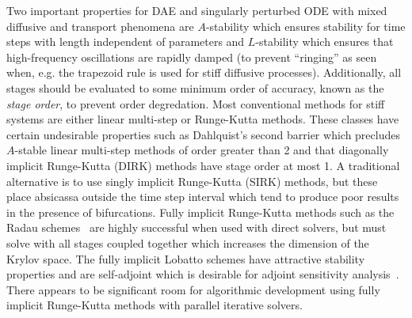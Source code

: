 Two important properties for DAE and singularly perturbed ODE with mixed diffusive and transport phenomena are $A$-stability which ensures stability for time steps with length independent of parameters and $L$-stability which ensures that high-frequency oscillations are rapidly damped (to prevent ``ringing'' as seen when, e.g. the trapezoid rule is used for stiff diffusive processes).
Additionally, all stages should be evaluated to some minimum order of accuracy, known as the \emph{stage order}, to prevent order degredation.
Most conventional methods for stiff systems are either linear multi-step or Runge-Kutta methods.
These classes have certain undesirable properties such as Dahlquist's second barrier which precludes $A$-stable linear multi-step methods of order greater than 2 and that diagonally implicit Runge-Kutta (DIRK) methods have stage order at most 1.
A traditional alternative is to use singly implicit Runge-Kutta (SIRK) methods, but these place absicassa outside the time step interval which tend to produce poor results in the presence of bifurcations.
Fully implicit Runge-Kutta methods such as the Radau schemes~\citep{hairer1999stiff} are highly successful when used with direct solvers, but must solve with all stages coupled together which increases the dimension of the Krylov space.
The fully implicit Lobatto schemes have attractive stability properties and are self-adjoint which is desirable for adjoint sensitivity analysis~\citep{sandu2006properties,sandu2003direct}.
There appears to be significant room for algorithmic development using fully implicit Runge-Kutta methods with parallel iterative solvers.

